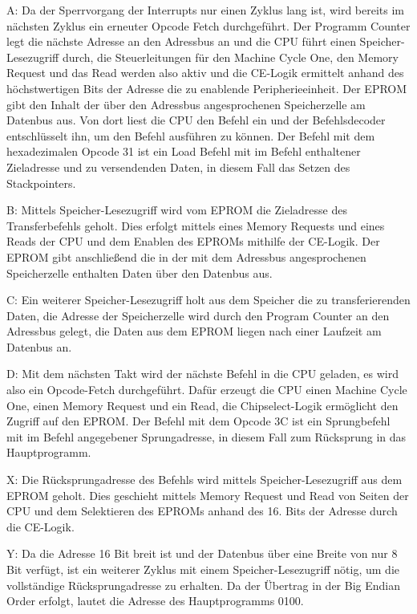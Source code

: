 A: Da der Sperrvorgang der Interrupts nur einen Zyklus lang ist, wird bereits im nächsten Zyklus ein erneuter Opcode Fetch durchgeführt. Der Programm Counter legt die nächste Adresse an den Adressbus an und die CPU führt einen Speicher-Lesezugriff durch, die Steuerleitungen für den Machine Cycle One, den Memory Request und das Read werden also aktiv und die CE-Logik ermittelt anhand des höchstwertigen Bits der Adresse die zu enablende Peripherieeinheit. Der EPROM gibt den Inhalt der über den Adressbus angesprochenen Speicherzelle am Datenbus aus. Von dort liest die CPU den Befehl ein und der Befehlsdecoder entschlüsselt ihn, um den Befehl ausführen zu können. Der Befehl mit dem hexadezimalen Opcode 31 ist ein Load Befehl mit im Befehl enthaltener Zieladresse und zu versendenden Daten, in diesem Fall das Setzen des Stackpointers.

B: Mittels Speicher-Lesezugriff wird vom EPROM die Zieladresse des Transferbefehls geholt. Dies erfolgt mittels eines Memory Requests und eines Reads der CPU und dem Enablen des EPROMs mithilfe der CE-Logik. Der EPROM gibt anschließend die in der mit dem Adressbus angesprochenen Speicherzelle enthalten Daten über den Datenbus aus.

C: Ein weiterer Speicher-Lesezugriff holt aus dem Speicher die zu transferierenden Daten, die Adresse der Speicherzelle wird durch den Program Counter an den Adressbus gelegt, die Daten aus dem EPROM liegen nach einer Laufzeit am Datenbus an.

D: Mit dem nächsten Takt wird der nächste Befehl in die CPU geladen, es wird also ein Opcode-Fetch durchgeführt. Dafür erzeugt die CPU einen Machine Cycle One, einen Memory Request und ein Read, die Chipselect-Logik ermöglicht den Zugriff auf den EPROM. Der Befehl mit dem Opcode 3C ist ein Sprungbefehl mit im Befehl angegebener Sprungadresse, in diesem Fall zum Rücksprung in das Hauptprogramm.

X: Die Rücksprungadresse des Befehls wird mittels Speicher-Lesezugriff aus dem EPROM geholt. Dies geschieht mittels Memory Request und Read von Seiten der CPU und dem Selektieren des EPROMs anhand des 16. Bits der Adresse durch die CE-Logik.

Y: Da die Adresse 16 Bit breit ist und der Datenbus über eine Breite von nur 8 Bit verfügt, ist ein weiterer Zyklus mit einem Speicher-Lesezugriff nötig, um die vollständige Rücksprungadresse zu erhalten. Da der Übertrag in der Big Endian Order erfolgt, lautet die Adresse des Hauptprogramms 0100.

